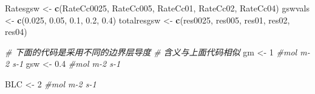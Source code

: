 \documentclass[
]{krantz}
\makeatletter
\newenvironment{Shaded}{\begin{snugshade}}{\end{snugshade}}
\newcommand{\CommentTok}[1]{\textcolor[rgb]{0.56,0.35,0.01}{\textit{#1}}}
\newcommand{\DecValTok}[1]{\textcolor[rgb]{0.00,0.00,0.81}{#1}}
\newcommand{\FloatTok}[1]{\textcolor[rgb]{0.00,0.00,0.81}{#1}}
\newcommand{\KeywordTok}[1]{\textcolor[rgb]{0.13,0.29,0.53}{\textbf{#1}}}
\newcommand{\NormalTok}[1]{#1}
\newcommand{\StringTok}[1]{\textcolor[rgb]{0.31,0.60,0.02}{#1}}
\newenvironment{kframe}{%
\medskip{}
\setlength{\fboxsep}{.8em}
 \def\at@end@of@kframe{}%
 \ifinner\ifhmode%
  \def\at@end@of@kframe{\end{minipage}}%
  \begin{minipage}{\columnwidth}%
 \fi\fi%
 \def\FrameCommand##1{\hskip\@totalleftmargin \hskip-\fboxsep
 \colorbox{shadecolor}{##1}\hskip-\fboxsep
     \hskip-\linewidth \hskip-\@totalleftmargin \hskip\columnwidth}%
 \MakeFramed {\advance\hsize-\width
   \@totalleftmargin\z@ \linewidth\hsize
   \@setminipage}}%
 {\par\unskip\endMakeFramed%
 \at@end@of@kframe}
\renewenvironment{Shaded}{\begin{kframe}}{\end{kframe}}
\makeatother
\begin{document}
\begin{Shaded}
\begin{Highlighting}[]
\NormalTok{Ratesgsw \textless{}{-}}\StringTok{ }\KeywordTok{c}\NormalTok{(RateCc0025, RateCc005, RateCc01, RateCc02, RateCc04)}
\NormalTok{gswvals \textless{}{-}}\StringTok{ }\KeywordTok{c}\NormalTok{(}\FloatTok{0.025}\NormalTok{, }\FloatTok{0.05}\NormalTok{, }\FloatTok{0.1}\NormalTok{, }\FloatTok{0.2}\NormalTok{, }\FloatTok{0.4}\NormalTok{)}
\NormalTok{totalresgsw \textless{}{-}}\StringTok{ }\KeywordTok{c}\NormalTok{(res0025, res005, res01, res02, res04)}

\CommentTok{\# 下面的代码是采用不同的边界层导度}
\CommentTok{\# 含义与上面代码相似}
\NormalTok{gm \textless{}{-}}\StringTok{ }\DecValTok{1} \CommentTok{\#mol m{-}2 s{-}1}
\NormalTok{gsw \textless{}{-}}\StringTok{ }\FloatTok{0.4} \CommentTok{\#mol m{-}2 s{-}1}

\NormalTok{BLC \textless{}{-}}\StringTok{ }\DecValTok{2} \CommentTok{\#mol m{-}2 s{-}1}


\end{Highlighting}
\end{Shaded}
\end{document}
